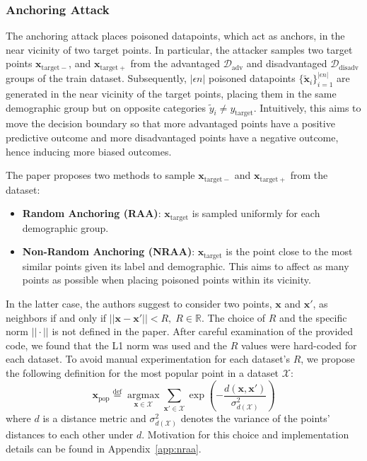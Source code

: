 \subsubsection{Anchoring Attack}
The anchoring attack places poisoned datapoints, which act as anchors, in the near vicinity of two target points. In particular, the attacker samples two target points $\mathbf{x}_{\mathrm{target-}}$, and $\mathbf{x}_{\mathrm{target+}}$ from the advantaged $\mathcal{D}_{\mathrm{adv}}$ and disadvantaged $\mathcal{D}_{\mathrm{disadv}}$ groups of the train dataset. Subsequently, $|\epsilon n|$ poisoned datapoints $\{\tilde{\mathbf{x}}_i \}_{i=1}^{|\epsilon n|}$ are generated in the near vicinity of the target points, placing them in the same demographic group but on opposite categories $\tilde{y}_i \neq y_{\mathrm{target}}$. Intuitively, this aims to move the decision boundary so that more advantaged points have a positive predictive outcome and more disadvantaged points have a negative outcome, hence inducing more biased outcomes.

The paper proposes two methods to sample $\mathbf{x}_{\mathrm{target-}}$ and $\mathbf{x}_{\mathrm{target+}}$ from the dataset:
\begin{itemize}
    \item \textbf{Random Anchoring (RAA)}: $\mathbf{x}_{\mathrm{target}}$ is sampled uniformly for each demographic group.
    \item \textbf{Non-Random Anchoring (NRAA)}: $\mathbf{x}_{\mathrm{target}}$ is the point close to the most similar points given its label and demographic. This aims to affect as many points as possible when placing poisoned points within its vicinity.
\end{itemize}

In the latter case, the authors suggest to consider two points, $\mathbf{x}$ and $\mathbf{x}'$, as neighbors if and only if $||\mathbf{x}-\mathbf{x}'|| < R,\; R\in\mathbb{R}$. The choice of $R$ and the specific norm $||\cdot||$ is not defined in the paper. After careful examination of the provided code, we found that the L1 norm was used and the $R$ values were hard-coded for each dataset. To avoid manual experimentation for each dataset's $R$, we propose the following definition for the most popular point in a dataset $\mathcal{X}$:
\begin{equation}
    \mathbf{x}_{\mathrm{pop}} \stackrel{\mathrm{def}}{=} \underset{\mathbf{x}\in\mathcal{X}}{\operatorname{argmax}} \displaystyle\sum_{\mathbf{x}'\in\mathcal{X}} \exp\left(-\frac{d(\mathbf{x}, \mathbf{x}')}{\sigma^2_{d(\mathcal{X})}}\right)
\end{equation}
where $d$ is a distance metric and $\sigma^2_{d(\mathcal{X})}$ denotes the variance of the points' distances to each other under $d$. Motivation for this choice and implementation details can be found in Appendix~\ref{app:nraa}.

